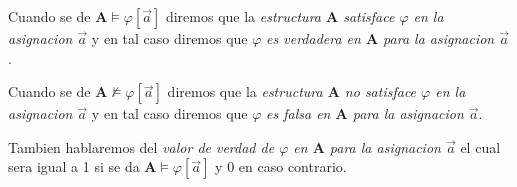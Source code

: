 \begin{definition}
  Cuando se de $\mathbf{A}\models\varphi[\vec{a}]$ diremos que la \emph{estructura $\mathbf{A}$ satisface $\varphi$ en la asignacion $\vec{a}$} y en tal caso
  diremos que $\varphi$ \emph{es verdadera en $\mathbf{A}$ para la asignacion $\vec{a}$}.

  Cuando se de $\mathbf{A}\not\models\varphi[\vec{a}]$ diremos que la \emph{estructura $\mathbf{A}$ no satisface $\varphi$ en la asignacion $\vec{a}$} y en tal caso
  diremos que $\varphi$ \emph{es falsa en $\mathbf{A}$ para la asignacion $\vec{a}$}.

  Tambien hablaremos del \emph{valor de verdad de $\varphi$ en $\mathbf{A}$ para la asignacion $\vec{a}$} el cual sera 
  igual a 1 si se da $\mathbf{A}\models\varphi[\vec{a}]$ y 0 en caso contrario.
\end{definition}

